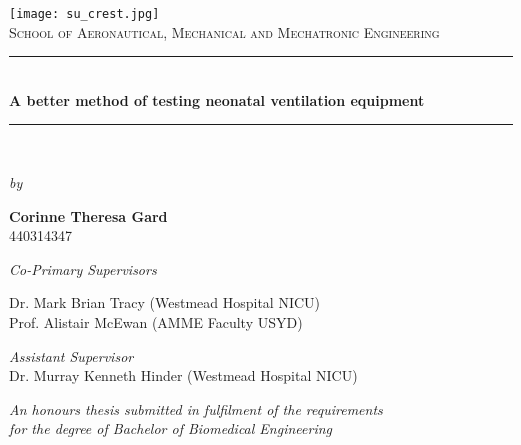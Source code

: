 \documentclass[12pt, openany, oneside]{book}
\begin{document}
{\selectfont

\begin{titlepage}
\newcommand{\HRule}{\rule{\linewidth}{0.1mm}} 
\center
\texttt{[image: su\_crest.jpg]}\\
\textsc{\large School of Aeronautical, Mechanical and Mechatronic Engineering}\\[0.5cm] 
\HRule \\[0.4cm]
\huge \bfseries A better method of testing neonatal ventilation equipment\\ 
\HRule \\[1cm]

\begin{center}

\small\textit{by}

\vspace{1cm}
								
\large\textbf{Corinne Theresa Gard}\\
440314347

\vspace{1cm}

\small\textit{Co-Primary Supervisors}\\

\normalsize
	
Dr. Mark Brian Tracy (Westmead Hospital NICU) \\

Prof. Alistair McEwan (AMME Faculty USYD)  \\

\vspace{0.2cm}

\small\textit{Assistant Supervisor}\\

\normalsize
Dr. Murray Kenneth Hinder (Westmead Hospital NICU)\\
				

\vspace*{1cm}

\small \textit{An honours thesis submitted in fulfilment of the requirements \\ for the degree of Bachelor of Biomedical Engineering}\\[2cm]

\end{center}
\end{titlepage}

}
\end{document}
